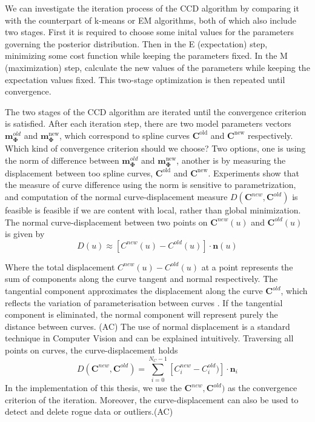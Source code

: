 We can investigate the iteration process of  the CCD algorithm by
comparing it with the counterpart of k-means or EM algorithms, both of
which also include two stages. First it is required to choose some
inital values for the parameters governing the posterior
distribution. Then in the E (expectation) step, minimizing some cost
function while keeping the parameters fixed. In the M (maximization)
step, calculate the new values of the parameters while keeping the
expectation values fixed. This two-stage optimization is then repeated
until convergence. 


The two stages of the CCD algorithm are iterated until the convergence
criterion is satisfied. After each iteration step, there are two
model parameters vectors $\mathbf{m}_{\mathbf{\Phi}}^{old}$ and
$\mathbf{m}_{\mathbf{\Phi}}^{\mathrm{new}}$, which correspond to
spline curves $\mathbf{C}^{\mathrm{old}}$ and
$\mathbf{C}^{\mathrm{new}}$ respectively. Which kind of convergence
criterion should we choose? Two options, one is using the norm of
difference between $\mathbf{m}_{\mathbf{\Phi}}^{old}$ and
$\mathbf{m}_{\mathbf{\Phi}}^{\mathrm{new}}$, another is by measuring
the displacement between too spline curves, $\mathbf{C}^{\mathrm{old}}$ and
$\mathbf{C}^{\mathrm{new}}$. Experiments show that the measure of
curve difference using the norm is sensitive to parametrization, and
computation of the normal curve-displacement measure $D(\mathbf{C}^{new},
\mathbf{C}^{old})$  is feasible is feasible if we are content with
local, rather than global minimization. The normal curve-displacement
between two points on $\mathbf{C}^{new}(u)$ and $\mathbf{C}^{old}(u)$ is given by 
\begin{equation}
  \label{eq:5.32}
  D(u) \approx
  [C^{new}(u) - C^{old}(u)] \cdot \mathbf{n}(u)
\end{equation}

Where the total displacement $C^{new}(u) - C^{old}(u)$
 at a point represents the sum of components along
the curve tangent and normal respectively. The tangential component
approximates the displacement along the curve
$\mathbf{C}^{old}$, which reflects the variation of parameterisation
between curves . If the tangential component is eliminated, the normal
component will represent purely the distance between curves. (AC) The
use of normal displacement is a standard technique in Computer Vision
and can be explained intuitively. 
Traversing all points on curves, the curve-displacement holds
\begin{equation}
  \label{eq:5.33}
  D(\mathbf{C}^{new}, \mathbf{C}^{old})  = \sum_{i=0}^{N_{C}-1} [C_{i}^{new} - C_{i}^{old})] \cdot \mathbf{n}_{i}
\end{equation}
In the implementation of this thesis, we use the $\mathbf{C}^{new},
\mathbf{C}^{old})$ as the convergence criterion of the
iteration. Moreover, the curve-displacement can also be used to detect
and delete rogue data or outliers.(AC)

